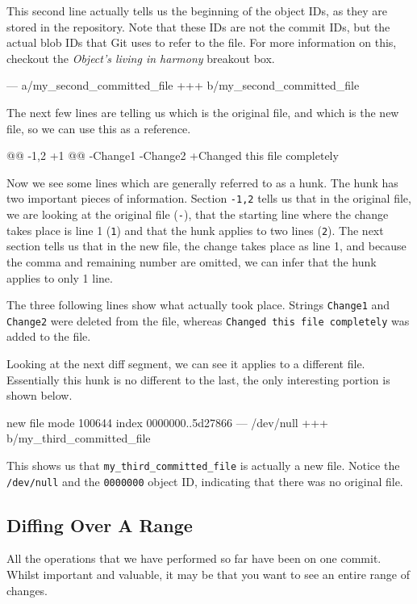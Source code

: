 This second line actually tells us the beginning of the object IDs, as they are stored in the repository.
Note that these IDs are not the commit IDs, but the actual blob IDs that Git uses to refer to the file.
For more information on this, checkout the \emph{Object's living in harmony} breakout box.

\begin{code}
--- a/my_second_committed_file
+++ b/my_second_committed_file
\end{code}

The next few lines are telling us which is the original file, and which is the new file, so we can use this as a reference.

\begin{code}
@@ -1,2 +1 @@
-Change1
-Change2
+Changed this file completely
\end{code}

Now we see some lines which are generally referred to as a hunk.
The hunk has two important pieces of information.
Section \texttt{-1,2} tells us that in the original file, we are looking at the original file (\texttt{-}), that the starting line where the change takes place is line 1 (\texttt{1}) and that the hunk applies to two lines (\texttt{2}).
The next section tells us that in the new file, the change takes place as line 1, and because the comma and remaining number are omitted, we can infer that the hunk applies to only 1 line.

The three following lines show what actually took place.
Strings \texttt{Change1} and \texttt{Change2} were deleted from the file, whereas \texttt{Changed this file completely} was added to the file.

Looking at the next diff segment, we can see it applies to a different file.
Essentially this hunk is no different to the last, the only interesting portion is shown below.

\begin{code}
new file mode 100644
index 0000000..5d27866
--- /dev/null
+++ b/my_third_committed_file
\end{code}

This shows us that \texttt{my\_third\_committed\_file} is actually a new file.
Notice the \texttt{/dev/null} and the \texttt{0000000} object ID, indicating that there was no original file.

\subsection{Diffing Over A Range}
All the operations that we have performed so far have been on one commit.
Whilst important and valuable, it may be that you want to see an entire range of changes.

